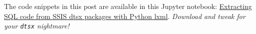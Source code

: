 The code snippets in this post are available in this Jupyter notebook:
\href{https://github.com/bakerjd99/jacks/blob/master/notebooks/Extracting\%20SQL\%20code\%20from\%20SSIS\%20dtsx\%20packages\%20with\%20Python\%20lxml.ipynb}{Extracting
SQL code from SSIS dtsx packages with Python lxml}. \emph{Download and tweak
for your \texttt{dtsx} nightmare!}

%
%
%
%
%



%
